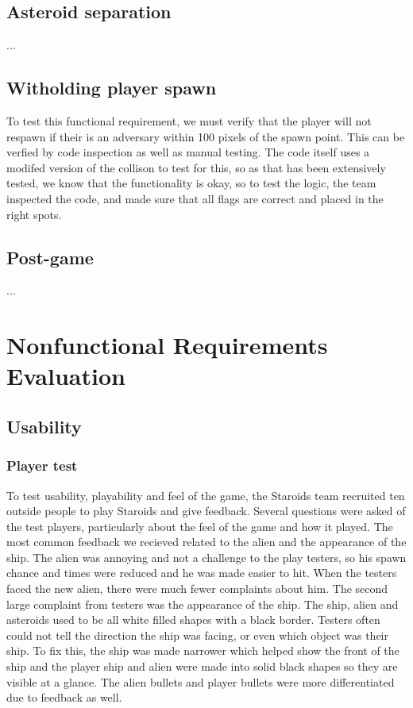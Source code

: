 \documentclass[12pt, titlepage]{article}
\begin{document}
\subsection{Asteroid separation}
...\\
\subsection{Witholding player spawn}
To test this functional requirement, we must verify that the player will not respawn if their is an adversary within 100 pixels of the spawn point. This can be verfied by code inspection as well as manual testing. The code itself uses a modifed version of the collison to test for this, so as that has been extensively tested, we know that the functionality is okay, so to test the logic, the team inspected the code, and made sure that all flags are correct and placed in the right spots.
\subsection{Post-game}
...\\



\section{Nonfunctional Requirements Evaluation}

\subsection{Usability}

\subsubsection{Player test}
To test usability, playability and feel of the game, the Staroids team recruited ten outside people to play Staroids and give feedback. Several questions were asked of the test players, particularly about the feel of the game and how it played. The most common feedback we recieved related to the alien and the appearance of the ship. The alien was annoying and not a challenge to the play testers, so his spawn chance and times were reduced and he was made easier to hit. When the testers faced the new alien, there were much fewer complaints about him. The second large complaint from testers was the appearance of the ship. The ship, alien and asteroids used to be all white filled shapes with a black border. Testers often could not tell the direction the ship was facing, or even which object was their ship. To fix this, the ship was made narrower which helped show the front of the ship and the player ship and alien were made into solid black shapes so they are visible at a glance. The alien bullets and player bullets were more differentiated due to feedback as well.\\
\end{document}
